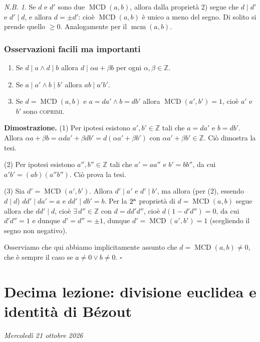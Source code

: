 \documentclass[11pt,a4paper]{article}
\newcommand{\Z}{\mathbb{Z}}
\theoremstyle{definition}
\theoremstyle{plain}
\theoremstyle{remark}
\newtheorem*{nb}{N.B.}
\begin{document}
\begin{nb}
Se $d$ e $d'$ sono due $\operatorname{MCD}(a,b)$, allora dalla proprietà 2) segue che $d\mid d'$ e $d'\mid d$, e allora $d=\pm d'$: cioè $\operatorname{MCD}(a,b)$ è unico a meno del segno. Di solito si prende quello $\ge0$. Analogamente per il $\operatorname{mcm}(a,b)$.
\end{nb}



\subsubsection*{Osservazioni facili ma importanti}

\begin{enumerate}[label=\textcircled{\small\arabic*}]
\item Se $d\mid a\wedge d\mid b$ allora $d\mid\alpha a+\beta b$ per ogni $\alpha,\beta\in\Z$.
\item Se $a\mid a'\wedge b\mid b'$ allora $ab\mid a'b'$.
\item Se $d=\operatorname{MCD}(a,b)$ e $a=da'\wedge b=db'$ allora $\operatorname{MCD}(a',b')=1$, cioè $a'$ e $b'$ sono \textsc{coprimi}.
\end{enumerate}

\textbf{Dimostrazione.}
(1) Per ipotesi esistono $a',b'\in\Z$ tali che $a=da'$ e $b=db'$. Allora $\alpha a+\beta b=\alpha da'+\beta db'=d(\alpha a'+\beta b')$ con $\alpha a'+\beta b'\in\Z$. Ciò dimostra la tesi.

(2) Per ipotesi esistono $a'',b''\in\Z$ tali che $a'=aa''$ e $b'=bb''$, da cui $a'b'=(ab)(a''b'')$. Ciò prova la tesi.

(3) Sia $d'=\operatorname{MCD}(a',b')$. Allora $d'\mid a'$ e $d'\mid b'$, ma allora (per (2), essendo $d\mid d$) $dd'\mid da'=a$ e $dd'\mid db'=b$. Per la $2^{\text a}$ proprietà di $d=\operatorname{MCD}(a,b)$ segue allora che $dd'\mid d$, cioè $\exists\,d''\in\Z$ con $d=dd'd''$, cioè $d(1-d'd'')=0$, da cui $d'd''=1$ e dunque $d'=d''=\pm1$, dunque $d'=\operatorname{MCD}(a',b')=1$ (scegliendo il segno non negativo).

Osserviamo che qui abbiamo implicitamente assunto che $d=\operatorname{MCD}(a,b)\neq0$, che è sempre il caso se $a\neq0\vee b\neq0$. \hfill$\square$

\section{Decima lezione: divisione euclidea e identità di Bézout}
\textit{Mercoledì 21 ottobre 2026}
\end{document}
